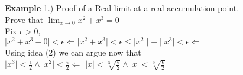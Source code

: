 \documentclass[12pt]{article}
\theoremstyle{definition}
\newenvironment{example}{\vspace{1em}\noindent\textbf{Example}}{\vspace{1em}}
\begin{document}
\begin{example}
1.) Proof of a Real limit at a real accumulation point.\\
Prove that $ \lim_{x\to 0} x^2 + x^3 = 0$\\

Fix $\epsilon > 0$,\\
$\mid x^2 + x^3 - 0 \mid < \epsilon \Leftarrow \mid x^2 + x^3 \mid < \epsilon \le \mid x^2 \mid + \mid x^3 \mid < \epsilon \Leftarrow $\\
Using idea (2) we can argue now that\\
$\mid x^3 \mid < \frac{\epsilon}{2} \land \mid x^2 \mid < \frac{\epsilon}{2} \Leftarrow$
$ \mid x \mid < \sqrt[3]{\frac{\epsilon}{2}} \land  \mid x \mid < \sqrt[2]{\frac{\epsilon}{2}} $





\end{example}





 
\end{document}
